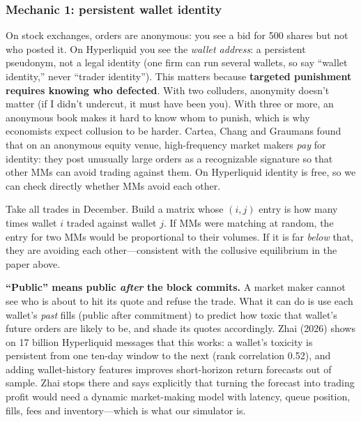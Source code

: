 \documentclass[11pt]{article}
\begin{document}
\subsubsection{Mechanic 1: persistent wallet identity}
On stock exchanges, orders are anonymous: you see a bid for 500 shares but not who posted it. On Hyperliquid you see the \emph{wallet address}: a persistent pseudonym, not a legal identity (one firm can run several wallets, so say ``wallet identity,'' never ``trader identity''). This matters because \textbf{targeted punishment requires knowing who defected}. With two colluders, anonymity doesn't matter (if I didn't undercut, it must have been you). With three or more, an anonymous book makes it hard to know whom to punish, which is why economists expect collusion to be harder. Cartea, Chang and Graumans found that on an anonymous equity venue, high-frequency market makers \emph{pay} for identity: they post unusually large orders as a recognizable signature so that other MMs can avoid trading against them. On Hyperliquid identity is free, so we can check directly whether MMs avoid each other.

\begin{example}
Take all trades in December. Build a matrix whose $(i,j)$ entry is how many times wallet $i$ traded against wallet $j$. If MMs were matching at random, the entry for two MMs would be proportional to their volumes. If it is far \emph{below} that, they are avoiding each other---consistent with the collusive equilibrium in the paper above.
\end{example}

\begin{warning}
\textbf{``Public'' means public \emph{after} the block commits.} A market maker cannot see who is about to hit its quote and refuse the trade. What it can do is use each wallet's \emph{past} fills (public after commitment) to predict how toxic that wallet's future orders are likely to be, and shade its quotes accordingly. Zhai (2026) shows on 17 billion Hyperliquid messages that this works: a wallet's toxicity is persistent from one ten-day window to the next (rank correlation 0.52), and adding wallet-history features improves short-horizon return forecasts out of sample. Zhai stops there and says explicitly that turning the forecast into trading profit would need a dynamic market-making model with latency, queue position, fills, fees and inventory---which is what our simulator is.
\end{warning}
\end{document}
